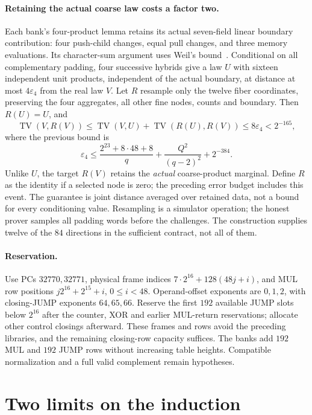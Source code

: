 \documentclass[11pt]{article}
\begin{document}
\paragraph{Retaining the actual coarse law costs a factor two.} Each bank's four-product lemma retains its actual seven-field linear boundary contribution: four push-child changes, equal pull changes, and three memory evaluations. Its character-sum argument uses Weil's bound~\cite{winger}. Conditional on all complementary padding, four successive hybrids give a law $U$ with sixteen independent unit products, independent of the actual boundary, at distance at most $4\varepsilon_4$ from the real law $V$. Let $R$ resample only the twelve fiber coordinates, preserving the four aggregates, all other fine nodes, counts and boundary. Then $R(U)=U$, and
\[
 \operatorname{TV}(V,R(V))
 \le\operatorname{TV}(V,U)+\operatorname{TV}(R(U),R(V))
 \le8\varepsilon_4<2^{-165},
\]
where the previous bound is
\[
 \varepsilon_4\le\frac{2^{23}+8\cdot48+8}{q}
       +\frac{Q^2}{(q-2)^2}+2^{-384}.
\]
Unlike $U$, the target $R(V)$ retains the \emph{actual} coarse-product marginal. Define $R$ as the identity if a selected node is zero; the preceding error budget includes this event. The guarantee is joint distance averaged over retained data, not a bound for every conditioning value. Resampling is a simulator operation; the honest prover samples all padding words before the challenges. The construction supplies twelve of the $84$ directions in the sufficient contract, not all of them.

\paragraph{Reservation.} Use PCs $32770,32771$, physical frame indices $7\cdot2^{16}+128(48j+i)$, and MUL row positions $j2^{16}+2^{15}+i$, $0\le i<48$. Operand-offset exponents are $0,1,2$, with closing-JUMP exponents $64,65,66$. Reserve the first $192$ available JUMP slots below $2^{16}$ after the counter, XOR and earlier MUL-return reservations; allocate other control closings afterward. These frames and rows avoid the preceding libraries, and the remaining closing-row capacity suffices. The banks add $192$ MUL and $192$ JUMP rows without increasing table heights. Compatible normalization and a full valid complement remain hypotheses.

\section{Two limits on the induction}
\end{document}
